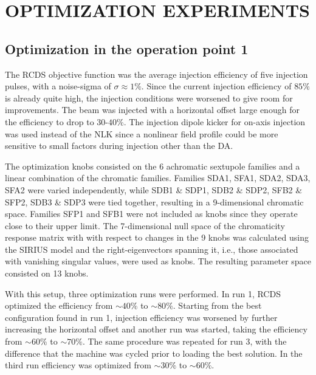 \documentclass[a4paper,
               keeplastbox,   %
               ]{jacow}
\begin{document}
\section{OPTIMIZATION EXPERIMENTS}

\subsection{Optimization in the  operation point 1}
The RCDS objective function was the average injection efficiency of five injection pulses, with a noise-sigma of $\sigma \approx 1\%$. Since the current injection efficiency of $85\%$ is already quite high, the injection conditions were worsened to give room for improvements. The beam was injected with a horizontal offset large enough for the efficiency to drop to $30$-$40\%$. The injection dipole kicker for on-axis injection was used instead of the NLK since a nonlinear field profile could be more sensitive to small factors during injection other than the DA. 

The optimization knobs consisted on the 6 achromatic sextupole families and a linear combination of the chromatic families. Families SDA1, SFA1, SDA2, SDA3, SFA2 were varied independently, while SDB1 \& SDP1, SDB2 \& SDP2, SFB2 \& SFP2, SDB3 \& SDP3 were tied together, resulting in a 9-dimensional chromatic space. Families SFP1 and SFB1 were not included as knobs since they operate close to their upper limit. The 7-dimensional null space of the chromaticity response matrix with with respect to changes in the 9 knobs was calculated using the SIRIUS model and the right-eigenvectors spanning it, i.e., those associated with vanishing singular values, were used as knobs. The resulting parameter space consisted on 13 knobs. 

With this setup, three optimization runs were performed. In run 1, RCDS optimized the efficiency from $\sim40\%$ to $\sim80\%$. Starting from the best configuration found in run 1, injection efficiency was worsened by further increasing the horizontal offset and another run was started, taking the efficiency from $\sim60\%$ to $\sim70\%$. The same procedure was repeated for run 3, with the difference that the machine was cycled prior to loading the best solution. In the third run efficiency was optimized from $\sim30\%$ to $\sim60\%$.
 
\end{document}
